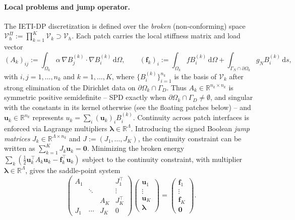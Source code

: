 \documentclass{article}
\newcommand{\vect}[1]{\boldsymbol{#1}}
\newcommand{\R}{\mathbb{R}}
\newcommand{\npatch}{K} %
\newcommand{\patchdom}[1]{\Omega_{#1}}            %
\newcommand{\Bloc}[2]{B^{(#1)}_{#2}}              %
\newcommand{\Vglo}{\mathcal{V}_h}                  %
\newcommand{\Vloc}[1]{\mathcal{V}_{#1}}            %
\newcommand{\Vprod}{\mathcal{V}_h^{\Pi}}           %
\newcommand{\Aloc}[1]{A_{#1}}                    %
\newcommand{\floc}[1]{\vect{f}_{#1}}             %
\newcommand{\Jloc}[1]{J_{#1}}                    %
\newcommand{\Jfull}{J}                            %
\newcommand{\uloc}[1]{\vect{u}_{#1}}             %
\newcommand{\lagmult}{\vect{\lambda}}             %
\theoremstyle{plain}
\numberwithin{equation}{section}
\begin{document}
\paragraph{Local problems and jump operator.}
The IETI-DP discretization is defined over the \emph{broken} (non-conforming)
space $\Vprod := \prod_{k=1}^{\npatch}
    \Vloc{k} \supset \Vglo$. Each patch carries the local stiffness matrix and load vector
\begin{equation}
    (\Aloc{k})_{ij} := \int_{\patchdom{k}} \alpha\, \nabla \Bloc{k}{j} \cdot
    \nabla \Bloc{k}{i} \,\mathrm{d}\Omega, \qquad
    (\floc{k})_{i} := \int_{\patchdom{k}} f \Bloc{k}{i} \,\mathrm{d}\Omega
    + \int_{\Gamma_N \cap \partial\patchdom{k}} g_N \Bloc{k}{i} \,\mathrm{d}s,
    \label{eq:local-stiffness}
\end{equation}
with $i, j = 1, \dots, n_k$ and $k=1, \ldots, \npatch$, where $\{\Bloc{k}{i}\}_{i=1}^{n_k}$ is the basis of
$\Vloc{k}$ after strong elimination of the Dirichlet data on
$\partial\patchdom{k} \cap \Gamma_D$. Thus $\Aloc{k} \in \R^{n_k \times n_k}$ is
symmetric positive semidefinite -- SPD exactly when
$\partial\patchdom{k} \cap \Gamma_D \neq \emptyset$, and singular with the
constants in its kernel otherwise (see the floating patches below) --
and $\uloc{k} \in \R^{n_k}$ represents $u_k = \sum_i (\uloc{k})_i \Bloc{k}{i}$.
Continuity across patch interfaces is enforced via Lagrange multipliers
$\lagmult \in \R^{\Lambda}$. Introducing the signed Boolean \emph{jump matrices}
$\Jloc{k} \in \R^{\Lambda \times n_k}$ and $\Jfull := (\Jloc{1}, \dots, \Jloc{\npatch})$,
the continuity constraint can be written as $\sum_{k=1}^{\npatch} \Jloc{k} \uloc{k} = \vect{0}$.
Minimizing the broken energy $\sum_k (\tfrac12 \uloc{k}^{\top} \Aloc{k} \uloc{k} -
    \floc{k}^{\top} \uloc{k})$ subject to the continuity constraint, with
multiplier $\lagmult \in \R^{\Lambda}$, gives the saddle-point system
\begin{equation}
    \begin{pmatrix}
        \Aloc{1} &        &                & \Jloc{1}^{\top}       \\
                 & \ddots &                & \vdots                \\
                 &        & \Aloc{\npatch} & \Jloc{\npatch}^{\top} \\
        \Jloc{1} & \cdots & \Jloc{\npatch} & 0
    \end{pmatrix}
    \begin{pmatrix}
        \uloc{1} \\ \vdots \\ \uloc{\npatch} \\ \lagmult
    \end{pmatrix}
    =
    \begin{pmatrix}
        \floc{1} \\ \vdots \\ \floc{\npatch} \\ \vect{0}
    \end{pmatrix}.
    \label{eq:ieti-saddle}
\end{equation}
\end{document}
